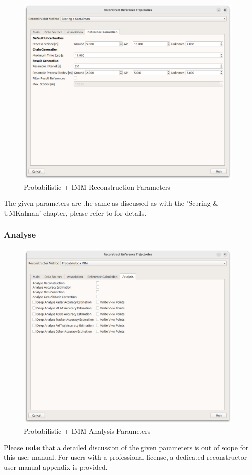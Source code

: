 \begin{figure}[H]
    \center
      \includegraphics[width=16cm]{figures/dialog_ref_calc.png}
    \caption{Probabilistic + IMM Reconstruction Parameters}
\end{figure}

The given parameters are the same as discussed as with the 'Scoring \& UMKalman' chapter, please refer to  for details.

\subsubsection{Analyse}

\begin{figure}[H]
    \center
      \includegraphics[width=16cm]{figures/dialog_probimm_analyse.png}
    \caption{Probabilistic + IMM Analysis Parameters}
\end{figure}

Please \textbf{note} that a detailed discussion of the given parameters is out of scope for this user manual. For users with a professional license, a dedicated reconstructor user manual appendix is provided.
